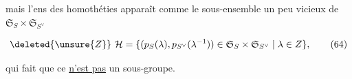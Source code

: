 mais l'ens des homothéties apparaît comme le sous-ensemble un peu vicieux de $\mathfrak S_S\times\mathfrak S_{S^\vee}$

\[
\deleted{\unsure{Z}}\ \mathcal H=\{(p_S(\lambda),p_{S^\vee}(\lambda^{-1}))\in\mathfrak S_S\times\mathfrak S_{S^\vee}\mid\lambda\in Z\}, \tag*{(64)}
\]

qui fait que ce \uline{n'est pas}  un sous-groupe.

